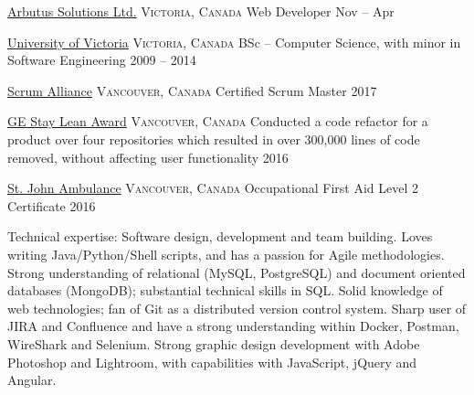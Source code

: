 \documentclass[10pt,a4paper]{article}
\begin{document}
\headedsection  %
  {\href{http://arbutussolutions.com/}{Arbutus Solutions Ltd.}}
  {\textsc{Victoria, Canada}} {
  \headedsubsection
    {Web Developer}
    {Nov  -- Apr }
    {}
}

\spacedhrule{0.5em}{-0.4em}


\headedsection
  {\href{https://www.uvic.ca/}{University of Victoria}}
  {\textsc{Victoria, Canada}} {
  \headedsubsection
    {BSc -- Computer Science, with minor in Software Engineering}
    {2009 -- 2014}
    {}
}

\spacedhrule{0.5em}{-0.4em}

\headedsection
  {\href{https://www.scrumalliance.org/}{Scrum Alliance}}
  {\textsc{Vancouver, Canada}} {
  \headedsubsection
    {Certified Scrum Master}
    {2017}
    {}
}

\headedsection
  {\href{https://www.ge.com}{GE Stay Lean Award}}
  {\textsc{Vancouver, Canada}} {
  \headedsubsection
    {Conducted a code refactor for a product over four repositories which resulted in over 300,000 lines of code removed, without affecting user functionality }
    {2016}
    {}
}

\headedsection
  {\href{https://www.sja.ca}{St. John Ambulance}}
  {\textsc{Vancouver, Canada}} {
  \headedsubsection
    {{Occupational First Aid Level 2 Certificate}}
    {2016}
    {}
}

\spacedhrule{0.5em}{-0.4em}

\inlineheadsection  %
  {Technical expertise:}
  {Software design, development and team building. Loves writing 
Java/\nsp Python/\nsp Shell scripts, and has a passion for Agile methodologies. Strong understanding of relational
(MySQL, PostgreSQL) and document oriented databases (MongoDB); substantial technical skills in SQL. Solid knowledge of web technologies; fan of Git as a distributed version control system. Sharp user of JIRA and Confluence and have a strong understanding within Docker, Postman, WireShark and Selenium. Strong graphic design development with Adobe Photoshop and Lightroom, with capabilities with JavaScript, jQuery and Angular.}
\end{document}
